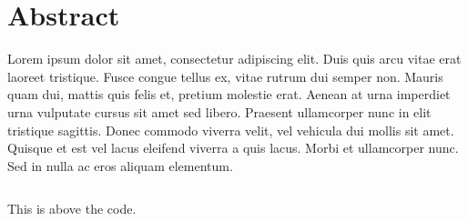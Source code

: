 
\chapter*{Abstract}

 Lorem ipsum dolor sit amet, consectetur adipiscing elit. Duis quis arcu vitae erat laoreet tristique. Fusce congue tellus ex, vitae rutrum dui semper non. Mauris quam dui, mattis quis felis et, pretium molestie erat. Aenean at urna imperdiet urna vulputate cursus sit amet sed libero. Praesent ullamcorper nunc in elit tristique sagittis. Donec commodo viverra velit, vel vehicula dui mollis sit amet. Quisque et est vel lacus eleifend viverra a quis lacus. Morbi et ullamcorper nunc. Sed in nulla ac eros aliquam elementum.
 
\begin{listing}[H]
     \inputminted{python}{technicalreport/listing/test.py}
     \caption{This is above the code.}
     \label{lst:the-code}
\end{listing}